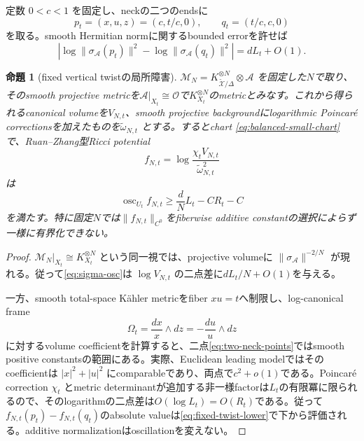 \documentclass[11pt,a4paper]{ltjsarticle}
\newtheorem{proposition}[theorem]{命題}
\theoremstyle{definition}
\theoremstyle{remark}
\begin{document}
定数 $0<c<1$ を固定し、neckの二つのendsに
\begin{equation}\label{eq:two-neck-points}
 p_t=(x,u,z)=(c,t/c,0),\qquad
 q_t=(t/c,c,0)
\end{equation}
を取る。smooth Hermitian normに関するbounded errorを許せば
\begin{equation}\label{eq:sigma-osc}
 \left|
 \log\|\sigma_{\mathcal A}(p_t)\|^2-
 \log\|\sigma_{\mathcal A}(q_t)\|^2
 \right|
 =dL_t+O(1).
\end{equation}

\begin{proposition}[fixed vertical twistの局所障害]\label{prop:fixed-twist-obstruction}
$\mathcal M_N=K_{\widetilde{\mathcal X}/\Delta}^{\otimes N}\otimes\mathcal A$ を固定した$N$で取り、そのsmooth projective metricを$\mathcal A|_{X_t}\cong\mathcal O$で$K_{X_t}^{\otimes N}$のmetricとみなす。これから得られるcanonical volumeを$V_{N,t}$、smooth projective backgroundにlogarithmic Poincaré correctionsを加えたものを$\widetilde\omega_{N,t}$ とする。するとchart \eqref{eq:balanced-small-chart} で、Ruan--Zhang型Ricci potential
\[
 f_{N,t}=\log\frac{\chi_tV_{N,t}}{\widetilde\omega_{N,t}^{2}}
\]
は
\begin{equation}\label{eq:fixed-twist-lower}
 \operatorname{osc}_{U_t} f_{N,t}
 \ge \frac dN L_t-C R_t-C
\end{equation}
を満たす。特に固定$N$では$\|f_{N,t}\|_{C^0}$をfiberwise additive constantの選択によらず一様に有界化できない。
\end{proposition}

\begin{proof}
$\mathcal M_N|_{X_t}\cong K_{X_t}^{\otimes N}$ という同一視では、projective volumeに
$\|\sigma_{\mathcal A}\|^{-2/N}$ が現れる。従って\eqref{eq:sigma-osc}は
$\log V_{N,t}$ の二点差に$dL_t/N+O(1)$を与える。

一方、smooth total-space Kähler metricをfiber $xu=t$へ制限し、log-canonical frame
\[
 \Omega_t=\frac{dx}{x}\wedge dz=-\frac{du}{u}\wedge dz
\]
に対するvolume coefficientを計算すると、二点\eqref{eq:two-neck-points}ではsmooth positive constantsの範囲にある。実際、Euclidean leading modelではそのcoefficientは
$|x|^2+|u|^2$ にcomparableであり、両点で$c^2+o(1)$である。Poincaré correction $\chi_t$ とmetric determinantが追加する非一様factorは$L_t$の有限冪に限られるので、そのlogarithmの二点差は$O(\log L_t)=O(R_t)$である。従って$f_{N,t}(p_t)-f_{N,t}(q_t)$のabsolute valueは\eqref{eq:fixed-twist-lower}で下から評価される。additive normalizationはoscillationを変えない。
\end{proof}
\end{document}
